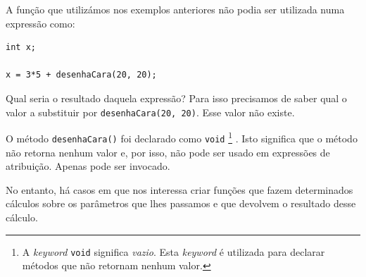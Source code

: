 A função que utilizámos nos exemplos anteriores não podia ser utilizada numa expressão como:
\begin{lstlisting}
int x;

x = 3*5 + desenhaCara(20, 20);
\end{lstlisting}
Qual seria o resultado daquela expressão? Para isso precisamos de saber qual o valor a substituir por \texttt{desenhaCara(20, 20)}. Esse valor não existe.

O método \texttt{desenhaCara()} foi declarado como \texttt{void}%
\footnote{A \emph{keyword} \texttt{void} significa \emph{vazio}. Esta \emph{keyword} é utilizada para declarar métodos que não retornam nenhum valor.}%
.
Isto significa que o método não retorna nenhum valor e, por isso, não pode ser usado em expressões de atribuição. Apenas pode ser invocado.

No entanto, há casos em que nos interessa criar funções que fazem determinados cálculos sobre os parâmetros que lhes passamos e que devolvem o resultado desse cálculo. 


